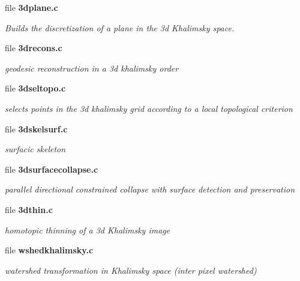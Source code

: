 \begin{CompactItemize}
\item 
file {\bf 3dplane.c}
\begin{CompactList}\small\item\em Builds the discretization of a plane in the 3d Khalimsky space. \item\end{CompactList}

\item 
file {\bf 3drecons.c}
\begin{CompactList}\small\item\em geodesic reconstruction in a 3d khalimsky order \item\end{CompactList}

\item 
file {\bf 3dseltopo.c}
\begin{CompactList}\small\item\em selects points in the 3d khalimsky grid according to a local topological criterion \item\end{CompactList}

\item 
file {\bf 3dskelsurf.c}
\begin{CompactList}\small\item\em surfacic skeleton \item\end{CompactList}

\item 
file {\bf 3dsurfacecollapse.c}
\begin{CompactList}\small\item\em parallel directional constrained collapse with surface detection and preservation \item\end{CompactList}

\item 
file {\bf 3dthin.c}
\begin{CompactList}\small\item\em homotopic thinning of a 3d Khalimsky image \item\end{CompactList}

\item 
file {\bf wshedkhalimsky.c}
\begin{CompactList}\small\item\em watershed transformation in Khalimsky space (inter pixel watershed) \item\end{CompactList}

\end{CompactItemize}
